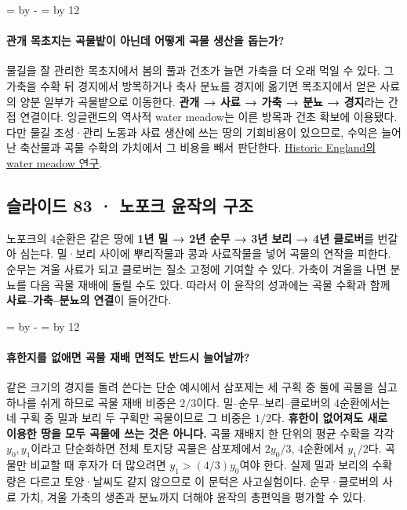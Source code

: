 \documentclass[10pt,a4paper]{article}
\newcommand{\ReserveQuestionSpace}{%
  \par\begingroup
  \dimen0=\pagegoal \advance\dimen0 by -\pagetotal
  \dimen2=\baselineskip \multiply\dimen2 by 12
  \ifdim\dimen0<\dimen2 \newpage\fi
  \endgroup}
\begin{document}
\ReserveQuestionSpace
\paragraph{관개 목초지는 곡물밭이 아닌데 어떻게 곡물 생산을 돕는가?}

물길을 잘 관리한 목초지에서 봄의 풀과 건초가 늘면 가축을 더 오래 먹일 수 있다. 그 가축을 수확 뒤 경지에서 방목하거나 축사 분뇨를 경지에 옮기면 목초지에서 얻은 사료의 양분 일부가 곡물밭으로 이동한다. \textbf{관개 → 사료 → 가축 → 분뇨 → 경지}라는 간접 연결이다. 잉글랜드의 역사적 water meadow는 이른 방목과 건초 확보에 이용됐다. 다만 물길 조성·관리 노동과 사료 생산에 쓰는 땅의 기회비용이 있으므로, 수익은 늘어난 축산물과 곡물 수확의 가치에서 그 비용을 빼서 판단한다. \href{https://historicengland.org.uk/images-books/publications/iha-water-meadows/heag237-water-meadows/}{Historic England의 water meadow 연구}.\par

\subsection{슬라이드 83 · 노포크 윤작의 구조}
노포크의 4순환은 같은 땅에 \textbf{1년 밀 → 2년 순무 → 3년 보리 → 4년 클로버}를 번갈아 심는다. 밀·보리 사이에 뿌리작물과 콩과 사료작물을 넣어 곡물의 연작을 피한다. 순무는 겨울 사료가 되고 클로버는 질소 고정에 기여할 수 있다. 가축이 겨울을 나면 분뇨를 다음 곡물 재배에 돌릴 수도 있다. 따라서 이 윤작의 성과에는 곡물 수확과 함께 \textbf{사료–가축–분뇨의 연결}이 들어간다.\par

\ReserveQuestionSpace
\paragraph{휴한지를 없애면 곡물 재배 면적도 반드시 늘어날까?}

같은 크기의 경지를 돌려 쓴다는 단순 예시에서 삼포제는 세 구획 중 둘에 곡물을 심고 하나를 쉬게 하므로 곡물 재배 비중은 $2/3$이다. 밀–순무–보리–클로버의 4순환에서는 네 구획 중 밀과 보리 두 구획만 곡물이므로 그 비중은 $1/2$다. \textbf{휴한이 없어져도 새로 이용한 땅을 모두 곡물에 쓰는 것은 아니다.} 곡물 재배지 한 단위의 평균 수확을 각각 $y_0,y_1$이라고 단순화하면 전체 토지당 곡물은 삼포제에서 $2y_0/3$, 4순환에서 $y_1/2$다. 곡물만 비교할 때 후자가 더 많으려면 $y_1>(4/3)y_0$여야 한다. 실제 밀과 보리의 수확량은 다르고 토양·날씨도 같지 않으므로 이 문턱은 사고실험이다. 순무·클로버의 사료 가치, 겨울 가축의 생존과 분뇨까지 더해야 윤작의 총편익을 평가할 수 있다.\par
\end{document}
